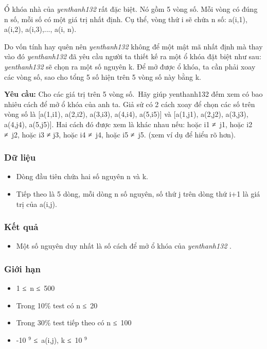 

Ổ khóa nhà của \emph{ yenthanh132 } rất đặc biệt. Nó gồm 5 vòng số. Mỗi vòng có đúng n số, mỗi số có một giá trị nhất định. Cụ thể, vòng thứ i sẽ chứa n số: a(i,1), a(i,2), a(i,3),..., a(i, n).

Do vốn tính hay quên nên \emph{ yenthanh132 } không để một mật mã nhất định mà thay vào đó \emph{ yenthanh132 } đã yêu cầu người ta thiết kế ra một ổ khóa đặt biệt như sau: \emph{ yenthanh132 } sẽ chọn ra một số nguyên k. Để mở được ổ khóa, ta cần phải xoay các vòng số, sao cho tổng 5 số hiện trên 5 vòng số này bằng k.

\textbf{Yêu cầu: } Cho các giá trị trên 5 vòng số. Hãy giúp yenthanh132 đếm xem có bao nhiêu cách để mở ổ khóa của anh ta. Giả sử có 2 cách xoay để chọn các số trên vòng số là [a(1,i1), a(2,i2), a(3,i3), a(4,i4), a(5,i5)] và [a(1,j1), a(2,j2), a(3,j3), a(4,j4), a(5,j5)]. Hai cách đó được xem là khác nhau nếu: hoặc i1 ≠ j1, hoặc i2 ≠ j2, hoặc i3 ≠ j3, hoặc i4 ≠ j4, hoặc i5 ≠ j5. (xem ví dụ để hiểu rõ hơn).

\subsubsection{Dữ liệu}
\begin{itemize}
	\item Dòng đầu tiên chứa hai số nguyên n và k.
	\item Tiếp theo là 5 dòng, mỗi dòng n số nguyên, số thứ j trên dòng thứ i+1 là giá trị của a(i,j).
\end{itemize}

\subsubsection{Kết quả}
\begin{itemize}
	\item Một số nguyên duy nhất là số cách để mở ổ khóa của \emph{ yenthanh132 } .
\end{itemize}

\subsubsection{Giới hạn}
\begin{itemize}
	\item 1 ≤ n ≤ 500
	\item Trong 10\% test có n ≤ 20
	\item Trong 30\% test tiếp theo có n ≤ 100
	\item -10 $^ 9 $ ≤ a(i,j), k ≤ 10 $^ 9 $
\end{itemize}

